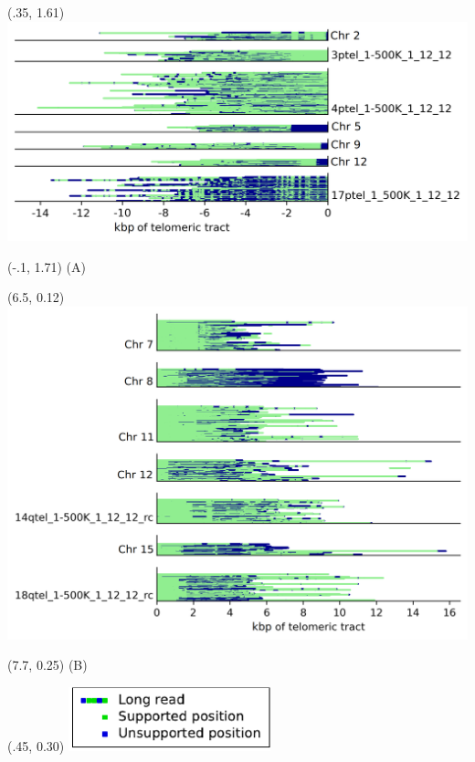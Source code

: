 \documentclass{article}
\begin{document}
\begin{textblock}{13}(.35,  1.61) \includegraphics[width=6in,keepaspectratio]{Figure_S1/p_arm-support.png}   \end{textblock}
\begin{textblock}{13}(-.1,  1.71) \LARGE{(A)} \end{textblock}

\begin{textblock}{13}(6.5,  0.12) \includegraphics[width=6in,keepaspectratio]{Figure_S1/q_arm-support.png}   \end{textblock}
\begin{textblock}{13}(7.7,  0.25) \LARGE{(B)} \end{textblock}

\begin{textblock}{13}(.45,  0.30) \includegraphics[width=2.300in,keepaspectratio]{Figure_S1/support-legend.pdf}   \end{textblock}
\end{document}
